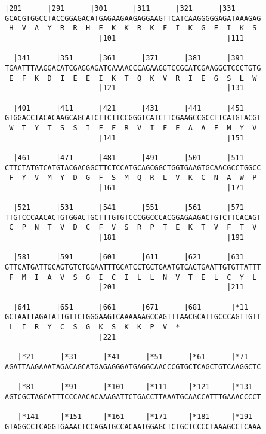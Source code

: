 \documentclass{article}
\begin{document}
\newpage
\begin{Verbatim}[fontfamily=courier]
  |281      |291      |301      |311      |321      |331    
GCACGTGGCCTACCGGAGACATGAGAAGAAGAGGAAGTTCATCAAGGGGGAGATAAAGAG
 H  V  A  Y  R  R  H  E  K  K  R  K  F  I  K  G  E  I  K  S 
                      |101                          |111    

  |341      |351      |361      |371      |381      |391    
TGAATTTAAGGACATCGAGGAGATCAAAACCCAGAAGGTCCGCATCGAAGGCTCCCTGTG
 E  F  K  D  I  E  E  I  K  T  Q  K  V  R  I  E  G  S  L  W 
                      |121                          |131    

  |401      |411      |421      |431      |441      |451    
GTGGACCTACACAAGCAGCATCTTCTTCCGGGTCATCTTCGAAGCCGCCTTCATGTACGT
 W  T  Y  T  S  S  I  F  F  R  V  I  F  E  A  A  F  M  Y  V 
                      |141                          |151    

  |461      |471      |481      |491      |501      |511    
CTTCTATGTCATGTACGACGGCTTCTCCATGCAGCGGCTGGTGAAGTGCAACGCCTGGCC
 F  Y  V  M  Y  D  G  F  S  M  Q  R  L  V  K  C  N  A  W  P 
                      |161                          |171    

  |521      |531      |541      |551      |561      |571    
TTGTCCCAACACTGTGGACTGCTTTGTGTCCCGGCCCACGGAGAAGACTGTCTTCACAGT
 C  P  N  T  V  D  C  F  V  S  R  P  T  E  K  T  V  F  T  V 
                      |181                          |191    

  |581      |591      |601      |611      |621      |631    
GTTCATGATTGCAGTGTCTGGAATTTGCATCCTGCTGAATGTCACTGAATTGTGTTATTT
 F  M  I  A  V  S  G  I  C  I  L  L  N  V  T  E  L  C  Y  L 
                      |201                          |211    

  |641      |651      |661      |671      |681       |*11   
GCTAATTAGATATTGTTCTGGGAAGTCAAAAAAGCCAGTTTAACGCATTGCCCAGTTGTT
 L  I  R  Y  C  S  G  K  S  K  K  P  V  *   
                      |221                                  

   |*21      |*31      |*41      |*51      |*61      |*71   
AGATTAAGAAATAGACAGCATGAGAGGGATGAGGCAACCCGTGCTCAGCTGTCAAGGCTC

   |*81      |*91      |*101     |*111     |*121     |*131  
AGTCGCTAGCATTTCCCAACACAAAGATTCTGACCTTAAATGCAACCATTTGAAACCCCT

   |*141     |*151     |*161     |*171     |*181     |*191  
GTAGGCCTCAGGTGAAACTCCAGATGCCACAATGGAGCTCTGCTCCCCTAAAGCCTCAAA

\end{Verbatim}
\end{document}

